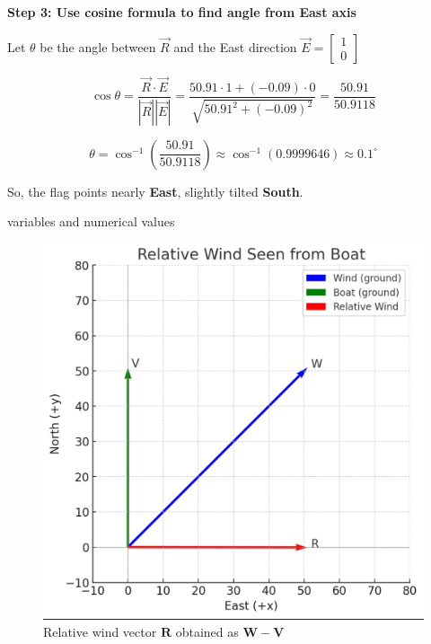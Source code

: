 \documentclass[journal]{IEEEtran}
\begin{document}
\textbf{Step 3: Use cosine formula to find angle from East axis}

Let $\theta$ be the angle between $\vec{R}$ and the East direction $\vec{E} = \begin{bmatrix} 1 \\ 0 \end{bmatrix}$

\[
\cos \theta = \frac{\vec{R} \cdot \vec{E}}{|\vec{R}||\vec{E}|}
= \frac{50.91 \cdot 1 + (-0.09)\cdot 0}{\sqrt{50.91^2 + (-0.09)^2}} = \frac{50.91}{50.9118}
\]

\[
\theta = \cos^{-1}\left( \frac{50.91}{50.9118} \right) \approx \cos^{-1}(0.9999646) \approx 0.1^\circ
\]

So, the flag points nearly \textbf{East}, slightly tilted \textbf{South}.



\begin{table}[h!]    
      \centering
      
      \caption{variables and numerical values}
    \end{table}


\begin{figure}[htbp]
\centering
\includegraphics[width=0.8\columnwidth]{figs/python image.png} 
\caption{Relative wind vector $\mathbf{R}$ obtained as $\mathbf{W}-\mathbf{V}$}
\label{fig:wind}
\end{figure}
\end{document}
